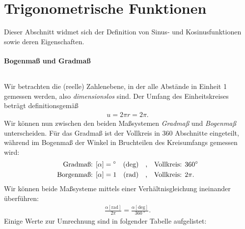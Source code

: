\thispagestyle{plain}
\section{Trigonometrische Funktionen} 

Dieser Abschnitt widmet sich der Definition von Sinus- und Kosinusfunktionen sowie deren Eigenschaften. 

\paragraph{Bogenmaß und Gradmaß}$~$

\begin{wrapfigure}{r}{7cm}
    \centering
    \vspace{-1cm}
    \vspace{-3mm}
\end{wrapfigure}

Wir betrachten die (reelle) Zahlenebene, in der alle Abstände in Einheit 1 gemessen werden, also \emph{dimensionslos} sind. Der Umfang des Einheitskreises beträgt definitionsgemäß 
\begin{align}
    u = 2\pi r = 2\pi.
\end{align}
Wir können nun zwischen den beiden Maßsystemen \emph{Gradmaß} und \emph{Bogenmaß} unterscheiden. Für das Gradmaß ist der Vollkreis in 360 Abschnitte eingeteilt, während im Bogenmaß der Winkel in Bruchteilen des Kreisumfangs gemessen wird:
\begin{align}
    \begin{split}
        \text{Gradmaß: } [\alpha] &= \si{\degree} \quad(\text{deg}) \qq{,} \text{Vollkreis: } \SI{360}{\degree}\\
        \text{Borgenmaß: } [\alpha] &= 1 \quad(\text{rad}) \qq{,} \text{Vollkreis: } 2\pi.
    \end{split}
\end{align}
Wir können beide Maßsysteme mittels einer Verhältnisgleichung ineinander überführen: 
\begin{align}
    \frac{\alpha [\text{rad}]}{2\pi} = \frac{\alpha [\text{deg}]}{\SI{360}{\degree}}.
\end{align}
Einige Werte zur Umrechnung sind in folgender Tabelle aufgelistet:

